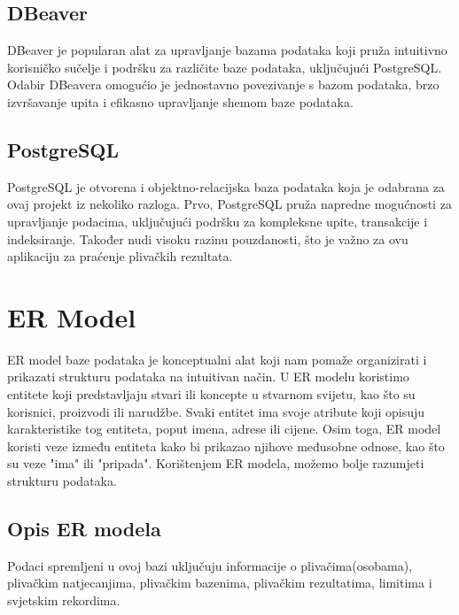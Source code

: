 \documentclass[times, utf8, zavrsni]{fer}
\begin{document}
\subsection{DBeaver}
DBeaver je popularan alat za upravljanje bazama podataka koji pruža intuitivno korisničko sučelje i 
podršku za različite baze podataka, uključujući PostgreSQL.
Odabir DBeavera omogućio je jednostavno povezivanje s bazom podataka, 
brzo izvršavanje upita i efikasno upravljanje shemom baze podataka.

\subsection{PostgreSQL}
PostgreSQL je otvorena i objektno-relacijska baza podataka koja je odabrana za ovaj projekt iz nekoliko razloga. 
Prvo, PostgreSQL pruža napredne mogućnosti za upravljanje podacima, uključujući podršku za kompleksne upite, transakcije i indeksiranje. 
Također nudi visoku razinu pouzdanosti, što je važno za ovu aplikaciju za praćenje plivačkih rezultata.

\clearpage

\section{ER Model}
ER model  baze podataka je konceptualni alat koji nam pomaže organizirati i prikazati strukturu podataka na intuitivan način. 
U ER modelu koristimo entitete koji predstavljaju stvari ili koncepte u stvarnom svijetu, kao što su korisnici, proizvodi ili narudžbe. 
Svaki entitet ima svoje atribute koji opisuju karakteristike tog entiteta, poput imena, adrese ili cijene. 
Osim toga, ER model koristi veze između entiteta kako bi prikazao njihove međusobne odnose, kao što su veze "ima" ili "pripada". 
Korištenjem ER modela, možemo bolje razumjeti strukturu podataka.

\vspace{\baselineskip}

\subsection{Opis ER modela}

Podaci spremljeni u ovoj bazi uključuju informacije o plivačima(osobama), plivačkim natjecanjima, plivačkim bazenima, plivačkim rezultatima, limitima i svjetskim rekordima.

\vspace{\baselineskip}
\end{document}

